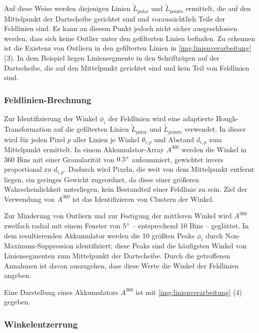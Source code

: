 Auf diese Weise werden diejenigen Linien $\widetilde{L}_\text{polar}$ und $\widetilde{L}_\text{points}$ ermittelt, die auf den Mittelpunkt der Dartscheibe gerichtet sind und voraussichtlich Teile der Feldlinien sind. Es kann an diesem Punkt jedoch nicht sicher ausgeschlossen werden, dass sich keine Outlier unter den gefilterten Linien befinden. Zu erkennen ist die Existenz von Outliern in den gefilterten Linien in \autoref{img:linienverarbeitung} (3). In dem Beispiel liegen Liniensegmente in den Schriftzügen auf der Dartscheibe, die auf den Mittelpunkt gerichtet sind und kein Teil von Feldlinien sind.

\subsubsection{Feldlinien-Brechnung}
\label{sec:feldlinien_berechnung}

Zur Identifizierung der Winkel $\phi_i$ der Feldlinien wird eine adaptierte Hough-Transformation auf die gefilterten Linien $\widetilde{L}_\text{polar}$ und $\widetilde{L}_\text{points}$ verwendet. In dieser wird für jeden Pixel $p$ aller Linien je Winkel $\theta_{i, p}$ und Abstand $d_{i, p}$ zum Mittelpunkt ermittelt. In einem Akkumulator-Array $A^{360}$ werden die Winkel in 360 Bins mit einer Granularität von $0.5^{\circ}$ aufsummiert, gewichtet invers proportional zu $d_{i, p}$. Dadurch wird Pixeln, die weit von dem Mittelpunkt entfernt liegen, ein geringes Gewicht zugeordnet, da diese einer größeren Wahrscheinlichkeit unterliegen, kein Bestandteil einer Feldlinie zu sein. Ziel der Verwendung von $A^{360}$ ist das Identifizieren von Clustern der Winkel.

Zur Minderung von Outliern und zur Festigung der mittleren Winkel wird $A^{360}$ zweifach radial mit einem Fenster von $5^{\circ}$ -- entsprechend 10 Bins -- geglättet. In dem resultierenden Akkumulator werden die 10 größten Peaks $\phi_i$ durch Non-Maximum-Suppression identifiziert; diese Peaks sind die häufigsten Winkel von Liniensegmenten zum Mittelpunkt der Dartscheibe. Durch die getroffenen Annahmen ist davon auszugehen, dass diese Werte die Winkel der Feldlinien angeben.

Eine Darstellung eines Akkumulators $A^{360}$ ist mit \autoref{img:linienverarbeitung} (4) gegeben.

\subsubsection{Winkelentzerrung}
\label{sec:winkelentzerrung}

